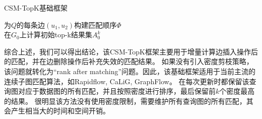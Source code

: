 \begin{algorithm}[h!]
\small
\caption{\label{alg:baseline:framework}CSM-TopK基础框架}
	为$Q$的每条边$(u_1, u_2)$构建匹配顺序$\Phi$ \label{code:build-matching-order} \\
	在$G_0$上计算初始top-k结果集$A_0^k$ \label{code:build-initial-topk}\\
\Return
\end{algorithm}

综合上述，我们可以得出结论，该CSM-TopK框架主要用于增量计算边插入操作后的匹配，并在边删除操作后补充失效的匹配结果。
如果没有引入密度剪枝策略，该问题就转化为“rank after matching”问题。因此，该基础框架适用于当前主流的连续子图匹配算法，如Rapidflow\cite{csm-rapidflow-DBLP:journals/pvldb/SunSHL22}, CaLiG\cite{csm-calig-DBLP:journals/pacmmod/YangZZY23}, GraphFlow\cite{csm-graphflow-DBLP:conf/sigmod/KankanamgeSMCS17}。
在每次更新时都保留该查询图对应于数据图的所有匹配，并且按照密度进行排序，最后保留前$k$个密度最高的结果。
很明显该方法没有使用密度限制，需要维护所有查询图的所有匹配，其会产生相当大的时间和空间开销。

